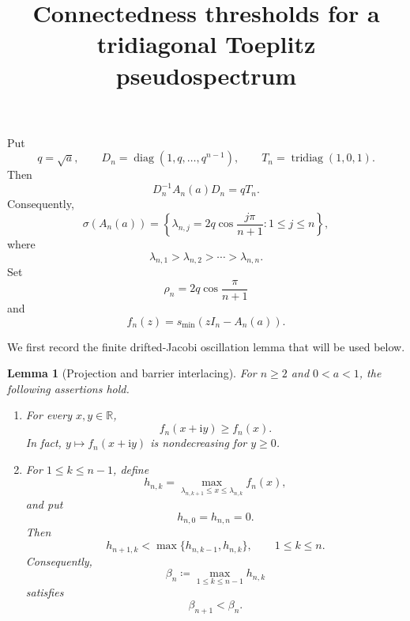 \documentclass[11pt]{article}
\title{Connectedness thresholds for a tridiagonal Toeplitz pseudospectrum}
\author{}
\date{}
\newtheorem{lemma}[theorem]{Lemma}
\begin{document}
\maketitle

Put
\[
q=\sqrt a,\qquad
D_n=\operatorname{diag}(1,q,\ldots,q^{n-1}),
\qquad
T_n=\operatorname{tridiag}(1,0,1).
\]
Then
\[
D_n^{-1}A_n(a)D_n=qT_n.
\]
Consequently,
\[
\sigma(A_n(a))
=
\left\{
\lambda_{n,j}=2q\cos\frac{j\pi}{n+1}:1\le j\le n
\right\},
\]
where
\[
\lambda_{n,1}>\lambda_{n,2}>\cdots>\lambda_{n,n}.
\]
Set
\[
\rho_n=2q\cos\frac{\pi}{n+1}
\]
and
\[
f_n(z)=s_{\min}(zI_n-A_n(a)).
\]

We first record the finite drifted-Jacobi oscillation lemma that will be used below.

\begin{lemma}[Projection and barrier interlacing]\label{lem:oscillation}
For \(n\ge2\) and \(0<a<1\), the following assertions hold.

\begin{enumerate}
\item For every \(x,y\in\mathbb R\),
\[
f_n(x+\mathrm i y)\ge f_n(x).
\]
In fact, \(y\mapsto f_n(x+\mathrm i y)\) is nondecreasing for \(y\ge0\).

\item For \(1\le k\le n-1\), define
\[
h_{n,k}
=
\max_{\lambda_{n,k+1}\le x\le\lambda_{n,k}}f_n(x),
\]
and put
\[
h_{n,0}=h_{n,n}=0.
\]
Then
\[
h_{n+1,k}
<
\max\{h_{n,k-1},h_{n,k}\},
\qquad 1\le k\le n.
\]
Consequently,
\[
\beta_n\coloneqq\max_{1\le k\le n-1}h_{n,k}
\]
satisfies
\[
\beta_{n+1}<\beta_n.
\]
\end{enumerate}
\end{lemma}
\end{document}
